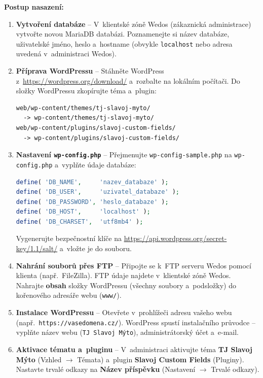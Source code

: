 \documentclass[12pt,a4paper]{article}
\begin{document}
\textbf{Postup nasazení:}

\begin{enumerate}
    \item \textbf{Vytvoření databáze} -- V~klientské zóně Wedos (zákaznická administrace) vytvořte novou MariaDB databázi. Poznamenejte si název databáze, uživatelské jméno, heslo a~hostname (obvykle \texttt{localhost} nebo adresa uvedená v~administraci Wedos).

    \item \textbf{Příprava WordPressu} -- Stáhněte WordPress z~\url{https://wordpress.org/download/} a~rozbalte na lokálním počítači. Do složky WordPressu zkopírujte téma a~plugin:

\begin{lstlisting}
web/wp-content/themes/tj-slavoj-myto/
  -> wp-content/themes/tj-slavoj-myto/
web/wp-content/plugins/slavoj-custom-fields/
  -> wp-content/plugins/slavoj-custom-fields/
\end{lstlisting}

    \item \textbf{Nastavení \texttt{wp-config.php}} -- Přejmenujte \texttt{wp-config-sample.php} na \texttt{wp-config.php} a~vyplňte údaje databáze:

\begin{lstlisting}[language=PHP]
define( 'DB_NAME',     'nazev_databaze' );
define( 'DB_USER',     'uzivatel_databaze' );
define( 'DB_PASSWORD', 'heslo_databaze' );
define( 'DB_HOST',     'localhost' );
define( 'DB_CHARSET',  'utf8mb4' );
\end{lstlisting}

    Vygenerujte bezpečnostní klíče na \url{https://api.wordpress.org/secret-key/1.1/salt/} a~vložte je do souboru.

    \item \textbf{Nahrání souborů přes FTP} -- Připojte se k~FTP serveru Wedos pomocí klienta (např.\ FileZilla). FTP údaje najdete v~klientské zóně Wedos. Nahrajte \textbf{obsah} složky WordPressu (všechny soubory a~podsložky) do kořenového adresáře webu (\texttt{www/}).

    \item \textbf{Instalace WordPressu} -- Otevřete v~prohlížeči adresu vašeho webu (např.\ \texttt{https://vasedomena.cz/}). WordPress spustí instalačního průvodce -- vyplňte název webu (\texttt{TJ Slavoj Mýto}), administrátorský účet a~e-mail.

    \item \textbf{Aktivace tématu a~pluginu} -- V~administraci aktivujte téma \textbf{TJ Slavoj Mýto} (Vzhled $\rightarrow$ Témata) a~plugin \textbf{Slavoj Custom Fields} (Pluginy). Nastavte trvalé odkazy na \textbf{Název příspěvku} (Nastavení $\rightarrow$ Trvalé odkazy).


\end{enumerate}
\end{document}
